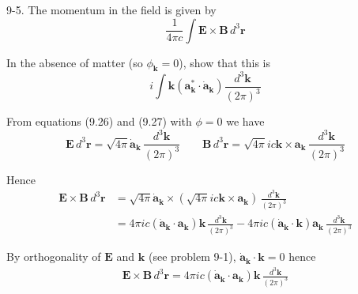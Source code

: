 \documentclass[12pt]{article}
\begin{document}
9-5.
The momentum in the field is given by
\begin{equation*}
\frac{1}{4\pi c}\int
\mathbf E\times\mathbf B\,d^3\mathbf r
\end{equation*}

In the absence of matter (so $\phi_{\mathbf k}=0$),
show that this is
\begin{equation*}
i\int\mathbf k\left(\mathbf a_{\mathbf k}^*\cdot\dot{\mathbf a}_{\mathbf k}\right)
\frac{d^3\mathbf k}{(2\pi)^3}
\end{equation*}

From equations (9.26) and (9.27) with $\phi=0$ we have
\begin{equation*}
\mathbf E\,d^3\mathbf r=\sqrt{4\pi}\dot{\mathbf a}_{\mathbf k}\,\frac{d^3\mathbf k}{(2\pi)^3}
\qquad
\mathbf B\,d^3\mathbf r=\sqrt{4\pi}ic\mathbf k\times\mathbf a_{\mathbf k}\,\frac{d^3\mathbf k}{(2\pi)^3}
\end{equation*}

Hence
\begin{align*}
\mathbf E\times\mathbf B\,d^3\mathbf r
&=\sqrt{4\pi}\dot{\mathbf a}_{\mathbf k}
\times\left(\sqrt{4\pi}ic\mathbf k\times\mathbf a_{\mathbf k}\right)
\,\frac{d^3\mathbf k}{(2\pi)^3}
\\
&=4\pi ic(\dot{\mathbf a}_{\mathbf k}\cdot\mathbf a_{\mathbf k})\mathbf k
\,\frac{d^3\mathbf k}{(2\pi)^3}
-4\pi ic(\dot{\mathbf a}_{\mathbf k}\cdot\mathbf k)\mathbf a_{\mathbf k}
\,\frac{d^3\mathbf k}{(2\pi)^3}
\end{align*}

By orthogonality of $\mathbf E$ and $\mathbf k$ (see problem 9-1),
$\dot{\mathbf a}_{\mathbf k}\cdot\mathbf k=0$ hence
\begin{align*}
\mathbf E\times\mathbf B\,d^3\mathbf r
=4\pi ic(\dot{\mathbf a}_{\mathbf k}\cdot\mathbf a_{\mathbf k})\mathbf k\,\frac{d^3\mathbf k}{(2\pi)^3}
\end{align*}
\end{document}
